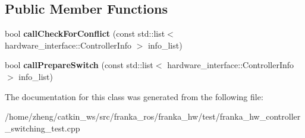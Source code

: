 \subsection*{Public Member Functions}
\begin{DoxyCompactItemize}
\item 
\mbox{\label{classfranka__hw_1_1_controller_conflict_a1866073ca8824484b91d31b39aaf4e65}} 
bool {\bfseries call\+Check\+For\+Conflict} (const std\+::list$<$ hardware\+\_\+interface\+::\+Controller\+Info $>$ info\+\_\+list)
\item 
\mbox{\label{classfranka__hw_1_1_controller_conflict_a5e0aca81981a150889db11c44a0d8a59}} 
bool {\bfseries call\+Prepare\+Switch} (const std\+::list$<$ hardware\+\_\+interface\+::\+Controller\+Info $>$ info\+\_\+list)
\end{DoxyCompactItemize}


The documentation for this class was generated from the following file\+:\begin{DoxyCompactItemize}
\item 
/home/zheng/catkin\+\_\+ws/src/franka\+\_\+ros/franka\+\_\+hw/test/franka\+\_\+hw\+\_\+controller\+\_\+switching\+\_\+test.\+cpp\end{DoxyCompactItemize}
